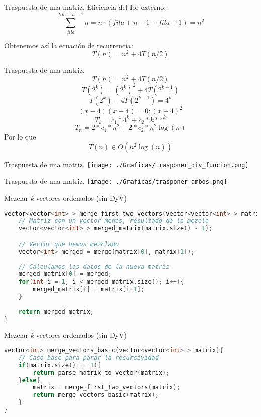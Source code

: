 \documentclass[10pt, xcolor=table]{beamer}
\begin{document}
\begin{frame}[fragile]{Traspuesta de una matriz. }
Eficiencia del for externo:
$$\sum_{fila}^{fila+n-1}n= n·(fila+n-1-fila+1) = n ^ 2$$

Obtenemos así la ecuación de recurrencia: $$T(n) = n^2 +4T(n/2)$$
\end{frame}

\begin{frame}[fragile]{Traspuesta de una matriz. }
$$T(n) = n^2 +4T(n/2)$$
$$T(2^k) = (2^k)^2+4T(2^{k-1})$$
$$T(2^k)-4T(2^{k-1}) = 4^k$$
$$(x-4)(x-4) = 0; (x-4)^2$$
$$T_k = c_1*4^k+c_2*k*4^k$$
$$T_n = 2*c_1*n^2 + 2*c_2*n^2\log(n)$$
Por lo que $$T(n) \in O(n^2\log (n))$$
\end{frame}




\begin{frame}[fragile]{Traspuesta de una matriz. }
\texttt{[image: ./Graficas/trasponer\_div\_funcion.png]}
\end{frame}

\begin{frame}[fragile]{Traspuesta de una matriz. }
\texttt{[image: ./Graficas/trasponer\_ambos.png]}
\end{frame}



\begin{frame}[fragile]{Mezclar \textit{k} vectores ordenados (sin DyV)}
\begin{lstlisting}[language=C]
vector<vector<int> > merge_first_two_vectors(vector<vector<int> > matrix){
	// Matriz con un vector menos, resultado de la mezcla
	vector<vector<int> > merged_matrix(matrix.size() - 1);

	// Vector que hemos mezclado
	vector<int> merged = merge(matrix[0], matrix[1]);
	
	// Calculamos los datos de la nueva matriz
	merged_matrix[0] = merged;
	for(int i = 1; i < merged_matrix.size(); i++){
		merged_matrix[i] = matrix[i+1];
	}
	
	return merged_matrix;
}
\end{lstlisting}
\end{frame}

\begin{frame}[fragile]{Mezclar \textit{k} vectores ordenados (sin DyV)}
\begin{lstlisting}[language=C]
vector<int> merge_vectors_basic(vector<vector<int> > matrix){
	// Caso base para parar la recursividad
	if(matrix.size() == 1){
		return parse_matrix_to_vector(matrix);	
	}else{
		matrix = merge_first_two_vectors(matrix);
		return merge_vectors_basic(matrix);
	}
}

\end{lstlisting}
\end{frame}
\end{document}

